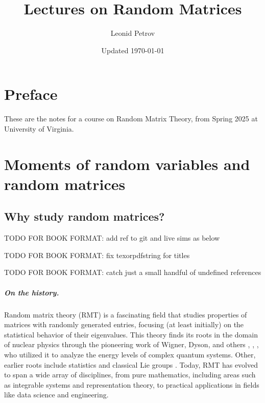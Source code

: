 \documentclass[letterpaper,11pt,oneside,reqno]{book}
\numberwithin{equation}{chapter}  %
\theoremstyle{definition}
\begin{document}
\title{Lectures on Random Matrices}
\author{Leonid Petrov}
\date{Updated \today}
\maketitle
\setcounter{tocdepth}{1}
\tableofcontents
\setcounter{tocdepth}{4}

\chapter*{Preface}

These are the notes for a course on Random Matrix Theory,
from Spring 2025 at University of Virginia.




\chapter{Moments of random variables and random
matrices}
\label{chap:lecture1}



\section{Why study random matrices?}

TODO FOR BOOK FORMAT: add ref to git and live sims as below

TODO FOR BOOK FORMAT: fix texorpdfstring for titles

TODO FOR BOOK FORMAT: catch just a small handful of undefined references

\paragraph{On the history.}
Random matrix theory (RMT) is a fascinating field that
studies
properties of matrices with randomly generated entries,
focusing (at least initially)
on the statistical behavior of their eigenvalues.
This theory finds its roots in the domain of nuclear
physics through the pioneering work of Wigner, Dyson, and
others \cite{wigner1955characteristic},
\cite{dyson1962brownian},
\cite{Dyson1962_III}, who utilized it to analyze the energy levels of complex quantum systems.
Other, earlier roots include statistics \cite{dixon1905generalization}
and classical Lie groups \cite{Hurwitz1897}.
Today, RMT has evolved to span a wide array of disciplines,
from pure mathematics, including areas such as integrable
systems and representation theory, to practical applications
in fields like data science and engineering.
\end{document}

